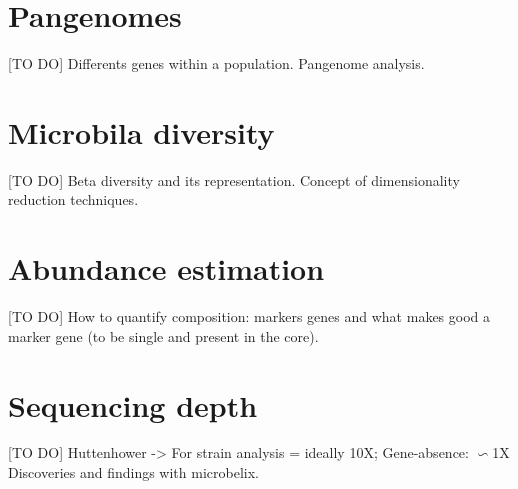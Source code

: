\section{Pangenomes}
[TO DO]
Differents genes within a population. Pangenome analysis.

\section{Microbila diversity}
[TO DO]
Beta diversity and its representation. Concept of dimensionality reduction techniques.

\section{Abundance estimation}
[TO DO]
How to quantify composition: markers genes and what makes good a marker gene (to be single and present in the core).

\section{Sequencing depth}
[TO DO]
Huttenhower -> For strain analysis = ideally 10X; Gene-absence: \(\backsim\)1X
Discoveries and findings with microbelix. 